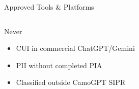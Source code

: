 \documentclass[aspectratio=169,11pt]{beamer}
\begin{document}
\begin{frame}[shrink=5]{Approved Tools \& Platforms}
\begin{columns}[T]
\vspace{6pt}

\begin{alertblock}{\faExclamationTriangle\quad Never}
{\scriptsize
\begin{itemize}
  \item CUI in commercial ChatGPT/Gemini
  \item PII without completed PIA
  \item Classified outside CamoGPT SIPR
\end{itemize}
}
\end{alertblock}

\end{columns}

\end{frame}

\end{document}
